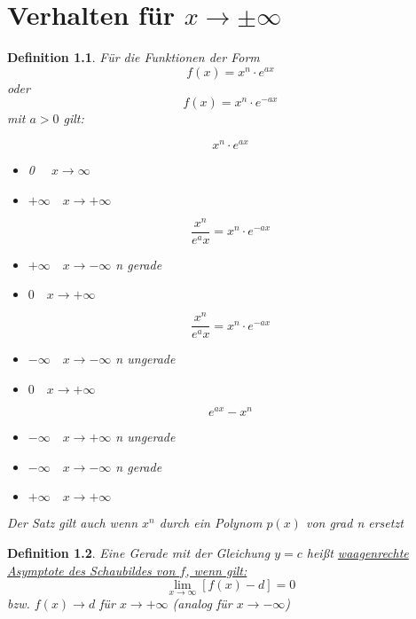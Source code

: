\documentclass{scrbook}
\newtheorem{definition}{Definition}
\begin{document}
\chapter{Verhalten für $x \rightarrow \pm \infty$}

\begin{definition}

Für die Funktionen der Form
\[f(x) = x^n\cdot e^{ax}\]
oder 
\[f(x) = x^n \cdot e^{-ax}\] mit $a>0$ gilt:

\[x^n \cdot e^{ax}\]
\begin{itemize}
\item 0 $\quad x\rightarrow \infty$ 
\item $+\infty \quad x \rightarrow + \infty$
\end{itemize}

\[ \frac{x^n}{e^ax} = x^n \cdot e^{-ax}\]
\begin{itemize}
\item $+\infty \quad x \rightarrow - \infty$ n gerade
\item $0 \quad x \rightarrow + \infty$

\end{itemize}

\[ \frac{x^n}{e^ax} = x^n \cdot e^{-ax}\]
\begin{itemize}
\item $-\infty \quad x \rightarrow - \infty$ n ungerade
\item $0 \quad x \rightarrow + \infty$
\end{itemize}

\[e^{ax} - x^n\]
\begin{itemize}
\item $-\infty \quad x \rightarrow + \infty$ n ungerade
\item $-\infty \quad x \rightarrow - \infty$ n gerade
\item $+ \infty \quad x \rightarrow + \infty$
\end{itemize}

Der Satz gilt auch wenn $x^n$ durch ein Polynom $p(x)$ von grad n ersetzt

\end{definition}

\begin{definition}
Eine Gerade mit der Gleichung $ y = c$ heißt
\underline{waagenrechte Asymptote des Schaubildes von $f$, wenn gilt:} 
\[ \lim_{x \to \infty} [ f(x) - d] = 0\]
bzw. $f(x) \rightarrow d$  für $x\rightarrow + \infty$
(analog für  $x \rightarrow - \infty$)
\end{definition}
\end{document}
